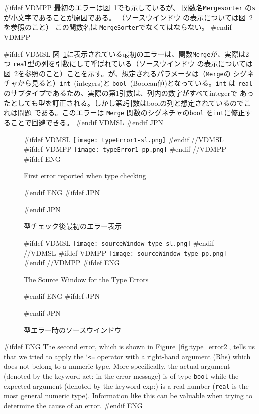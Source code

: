 \documentclass[\pformat,12pt]{article}
\newcommand{\Lit}[1]{`#1\Quote}
\newcommand{\Sig}[1]{\Lit{{\tt #1}}}
\newcommand{\guicmd}[1]{{\sf #1}}
\newcommand{\guicmd}[1]{{\gt #1}}
\begin{document}
#ifdef VDMPP
最初のエラーは図~\ref{fig:type_error1}でも示しているが、
関数名{\tt Merge\underline{s}orter} の{\tt s}が小文字であることが原因である。
（\guicmd{ソースウインドウ} の表示については図~\ref{fig:source-type}を参照のこと）
この関数名は {\tt MergeSorter}でなくてはならない。
#endif VDMPP

#ifdef VDMSL 
図~\ref{fig:type_error1}に表示されている最初のエラーは、関数{\tt Merge}が、実際は2つ
{\tt real}型の列を引数にして呼ばれている（\guicmd{ソースウインドウ} の表示については
図~\ref{fig:source-type}を参照のこと）ことを示す。が、想定されるパラメータは（{\tt Merge}の
シグネチャから見ると）{\tt int}~(integers)と {\tt bool}~(Boolean値)となっている。{\tt int} は
{\tt real}のサブタイプであるため、実際の第1引数は、列内の数字がすべてintegerで
あったとしても型を訂正される。しかし第2引数はboolの列と想定されているのでこれは問題
である。このエラーは {\tt Merge} 関数のシグネチャの{\tt bool} を{\tt int}に修正することで回避できる。
#endif VDMSL
#endif JPN

\begin{figure}[tbh]
\begin{center}
#ifdef VDMSL
\texttt{[image: typeError1-sl.png]}
#endif //VDMSL
#ifdef VDMPP
\texttt{[image: typeError1-pp.png]}
#endif //VDMPP
#ifdef ENG
\caption{First error reported when type checking}
#endif ENG
#ifdef JPN
\caption{型チェック後最初のエラー表示}
#endif JPN
\label{fig:type_error1}
\end{center}
\end{figure}

\begin{figure}[tbh]
\begin{center}
#ifdef VDMSL
\texttt{[image: sourceWindow-type-sl.png]}
#endif //VDMSL
#ifdef VDMPP
\texttt{[image: sourceWindow-type-pp.png]}
#endif //VDMPP
#ifdef ENG
\caption{The Source Window for the Type Errors}
#endif ENG
#ifdef JPN
\caption{型エラー時のソースウインドウ}
#endif JPN
\label{fig:source-type}
\end{center}
\end{figure}

#ifdef ENG
The second error, which is shown in Figure~\ref{fig:type_error2},
tells us that we tried to apply the \Sig{<=} operator with a
right-hand argument (Rhs) which does not belong to a numeric
type. More specifically, the actual argument (denoted by the keyword
{\sf act:} in the error message) is of type {\tt bool} while the 
expected argument (denoted by the keyword {\sf exp:}) is a real number
({\tt real} is the most general numeric type). Information like this
can be valuable when trying to determine the cause of an error.
#endif ENG
\end{document}
